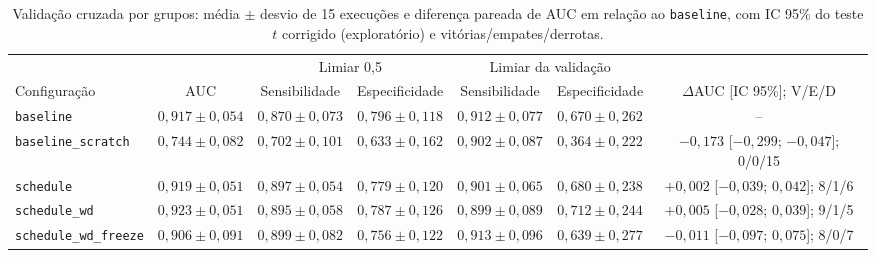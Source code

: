 \documentclass[conference]{IEEEtran}
\begin{document}
\begin{table}[t]
\centering
\caption{Configurações de treino da ResNet-18 (\textit{Warm.}: épocas de \textit{warmup}; WD: \textit{weight decay}; Cong.: épocas só da cabeça; LR cab.: taxa da cabeça).}
\label{tab:configs}
\footnotesize
\setlength{\tabcolsep}{3pt}
\end{table}

\begin{table}[t]
\centering
\caption{Validação cruzada por grupos: média $\pm$ desvio de 15 execuções e diferença pareada de AUC em relação ao \texttt{baseline}, com IC 95\% do teste $t$ corrigido (exploratório) e vitórias/empates/derrotas.}
\label{tab:cv}
\footnotesize
\setlength{\tabcolsep}{5pt}
\begin{tabular}{@{}lcccccc@{}}
\toprule
& & \multicolumn{2}{c}{Limiar 0,5} & \multicolumn{2}{c}{Limiar da validação} & \\
\cmidrule(lr){3-4}\cmidrule(lr){5-6}
Configuração & AUC & Sensibilidade & Especificidade & Sensibilidade & Especificidade & $\Delta$AUC [IC 95\%]; V/E/D \\
\midrule
\texttt{baseline} & $0{,}917\pm0{,}054$ & $0{,}870\pm0{,}073$ & $0{,}796\pm0{,}118$ & $0{,}912\pm0{,}077$ & $0{,}670\pm0{,}262$ & -- \\
\texttt{baseline\_scratch} & $0{,}744\pm0{,}082$ & $0{,}702\pm0{,}101$ & $0{,}633\pm0{,}162$ & $0{,}902\pm0{,}087$ & $0{,}364\pm0{,}222$ & $-0{,}173$ [$-0{,}299$; $-0{,}047$]; 0/0/15 \\
\texttt{schedule} & $0{,}919\pm0{,}051$ & $0{,}897\pm0{,}054$ & $0{,}779\pm0{,}120$ & $0{,}901\pm0{,}065$ & $0{,}680\pm0{,}238$ & $+0{,}002$ [$-0{,}039$; $0{,}042$]; 8/1/6 \\
\texttt{schedule\_wd} & $0{,}923\pm0{,}051$ & $0{,}895\pm0{,}058$ & $0{,}787\pm0{,}126$ & $0{,}899\pm0{,}089$ & $0{,}712\pm0{,}244$ & $+0{,}005$ [$-0{,}028$; $0{,}039$]; 9/1/5 \\
\texttt{schedule\_wd\_freeze} & $0{,}906\pm0{,}091$ & $0{,}899\pm0{,}082$ & $0{,}756\pm0{,}122$ & $0{,}913\pm0{,}096$ & $0{,}639\pm0{,}277$ & $-0{,}011$ [$-0{,}097$; $0{,}075$]; 8/0/7 \\
\bottomrule
\end{tabular}
\end{table}
\end{document}
